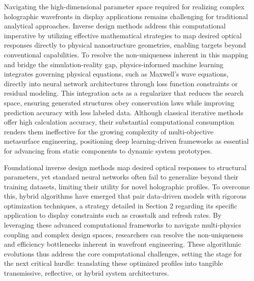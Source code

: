 \documentclass[11pt]{article}
\begin{document}
Navigating the high-dimensional parameter space required for realizing complex holographic wavefronts in display applications remains challenging for traditional analytical approaches. Inverse design methods address this computational imperative by utilizing effective mathematical strategies to map desired optical responses directly to physical nanostructure geometries, enabling targets beyond conventional capabilities. \citep{doi_10_1117_12_3099014_831c7349} \citep{doi_10_1364_ol_567547_28becc59} To resolve the non-uniqueness inherent in this mapping and bridge the simulation-reality gap, physics-informed machine learning integrates governing physical equations, such as Maxwell's wave equations, directly into neural network architectures through loss function constraints or residual modeling. \citep{doi_10_1002_adpr_202300158_66d61883} This integration acts as a regularizer that reduces the search space, ensuring generated structures obey conservation laws while improving prediction accuracy with less labeled data. Although classical iterative methods offer high calculation accuracy, their substantial computational consumption renders them ineffective for the growing complexity of multi-objective metasurface engineering, positioning deep learning-driven frameworks as essential for advancing from static components to dynamic system prototypes. \citep{doi_10_1088_1361_6439_ad3a72_72d60f33} \citep{doi_10_1002_adpr_202300158_66d61883} \citep{doi_10_71465_fapm546_bda368a5}

Foundational inverse design methods map desired optical responses to structural parameters, yet standard neural networks often fail to generalize beyond their training datasets, limiting their utility for novel holographic profiles. To overcome this, hybrid algorithms have emerged that pair data-driven models with rigorous optimization techniques, a strategy detailed in Section 2 regarding its specific application to display constraints such as crosstalk and refresh rates. By leveraging these advanced computational frameworks to navigate multi-physics coupling and complex design spaces, researchers can resolve the non-uniqueness and efficiency bottlenecks inherent in wavefront engineering. \citep{doi_10_1038_s41467_026_76714_x_8ca5d39b} These algorithmic evolutions thus address the core computational challenges, setting the stage for the next critical hurdle: translating these optimized profiles into tangible transmissive, reflective, or hybrid system architectures. \citep{doi_10_1021_acsphotonics_2c00968_06a2e96b} \citep{doi_10_1038_s41467_026_76714_x_8ca5d39b} \citep{doi_10_5757_asct_2023_32_6_141_32febf1c}
\end{document}
